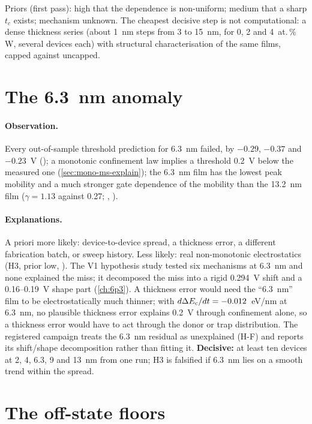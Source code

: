 Priors (first pass): high that the dependence is non-uniform; medium that a sharp $t_c$ exists; mechanism unknown. The
cheapest decisive step is not computational: a dense thickness series (about 1~nm steps from 3 to 15~nm, for 0, 2 and
4~at.\,\% W, several devices each) with structural characterisation of the same films, capped against uncapped.

\section{The 6.3~nm anomaly}
\label{sec:mono-alt-6p3}

\paragraph{Observation.} Every out-of-sample threshold prediction for 6.3~nm failed, by $-0.29$, $-0.37$ and
$-0.23$~V (); a monotonic confinement law implies a threshold 0.2~V below the measured one
(\cref{sec:mono-ms-explain}); the 6.3~nm film has the lowest peak mobility and a much stronger gate dependence of the
mobility than the 13.2~nm film ($\gamma = 1.13$ against 0.27; , ).

\paragraph{Explanations.} A priori more likely: device-to-device spread, a thickness error, a different fabrication
batch, or sweep history. Less likely: real non-monotonic electrostatics (H3, prior low, ). The V1
hypothesis study tested six mechanisms at 6.3~nm and none explained the miss; it decomposed the miss into a rigid
0.294~V shift and a 0.16--0.19~V shape part (\cref{ch:6p3}). A thickness error would need the ``6.3~nm'' film to be
electrostatically much thinner; with $d\Delta E_{\mathrm{c}}/dt = -0.012$~eV/nm at 6.3~nm, no plausible thickness error explains 0.2~V
through confinement alone, so a thickness error would have to act through the donor or trap distribution. The
registered campaign treats the 6.3~nm residual as unexplained (H-F) and reports its shift/shape decomposition rather
than fitting it. \textbf{Decisive:} at least ten devices at 2, 4, 6.3, 9 and 13~nm from one run; H3 is falsified if
6.3~nm lies on a smooth trend within the spread.

\section{The off-state floors}
\label{sec:mono-alt-floor}

